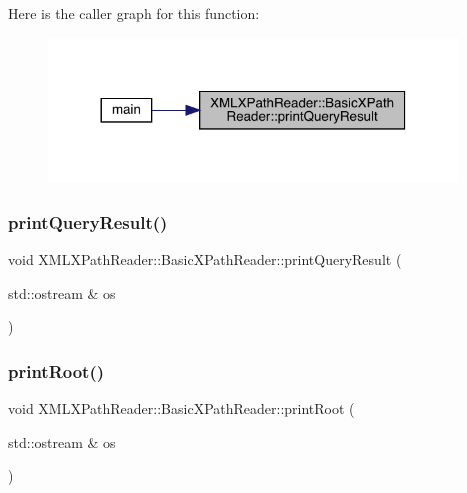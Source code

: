 Here is the caller graph for this function\+:\nopagebreak
\begin{figure}[H]
\begin{center}
\leavevmode
\includegraphics[width=308pt]{d6/dbf/classXMLXPathReader_1_1BasicXPathReader_a719ba9bbd4ae77d6be9a6544a2d0ccaf_icgraph}
\end{center}
\end{figure}
\mbox{\label{classXMLXPathReader_1_1BasicXPathReader_a719ba9bbd4ae77d6be9a6544a2d0ccaf}} 
\subsubsection{\texorpdfstring{printQueryResult()}{printQueryResult()}\hspace{0.1cm}{\footnotesize\ttfamily [2/2]}}
{\footnotesize\ttfamily void X\+M\+L\+X\+Path\+Reader\+::\+Basic\+X\+Path\+Reader\+::print\+Query\+Result (\begin{DoxyParamCaption}\item[{std\+::ostream \&}]{os }\end{DoxyParamCaption})}

\mbox{\label{classXMLXPathReader_1_1BasicXPathReader_abc0bfad898a5b01d2251d7aaacbbb507}} 
\subsubsection{\texorpdfstring{printRoot()}{printRoot()}\hspace{0.1cm}{\footnotesize\ttfamily [1/2]}}
{\footnotesize\ttfamily void X\+M\+L\+X\+Path\+Reader\+::\+Basic\+X\+Path\+Reader\+::print\+Root (\begin{DoxyParamCaption}\item[{std\+::ostream \&}]{os }\end{DoxyParamCaption})}




